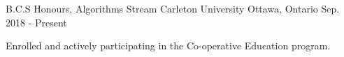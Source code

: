 



\begin{cventries}

  \cventry
    {B.C.S Honours, Algorithms Stream} %
    {Carleton University} %
    {Ottawa, Ontario} %
    {Sep. 2018 - Present} %
    {
      \begin{cvitems} %
        \item {Enrolled and actively participating in the Co-operative Education program.}
      \end{cvitems}
    }

\end{cventries}

